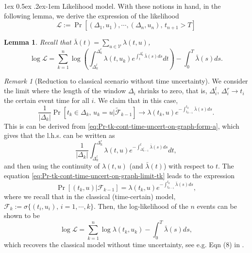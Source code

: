 \documentclass[11pt]{article}
\makeatletter
\newtheorem{lemma}[theorem]{Lemma}
\theoremstyle{remark}
\newtheorem{remark}{Remark}[section]
\theoremstyle{plain}
\newcommand{\calL}{\mathcal{L}}
\newcommand{\calF}{\mathcal{F}}
\newcommand{\calV}{\mathcal{V}}
\renewcommand{\paragraph}{%
  \@startsection{paragraph}{4}%
  {\z@}{1ex \@plus 0.5ex \@minus .2ex}{-1em}%
  {\normalfont\normalsize\itshape}%
}
\makeatother
\begin{document}
\paragraph{Likelihood model.}
With these notions in hand, in the following lemma, we derive the expression of the likelihood 
\[
\calL :=  \Pr [   (\Delta_1, u_1),  \cdots, ( \Delta_n, u_n), \, t_{n+1} > T] 
\]
\begin{lemma}\label{lemma:logL-cont-time-uncert-on-graph}
Recall that $\bar{\lambda}(t) = \sum_{u \in\calV} \lambda(t,u)$, 
\begin{equation}\label{eq:logL-cont-time-uncert-on-graph}
\log \calL = \sum_{k=1}^n \log \left( \int_{\Delta_k^l}^{\Delta_k^r} \lambda( t, u_k) e^{ \int_t^{\Delta_{k}^r}  \bar{\lambda} (s) ds} dt
		\right) - \int_0^T \bar{\lambda}(s) ds.
\end{equation}
\end{lemma}



\begin{remark}[Reduction to classical scenario without time uncertainty]
We consider the limit where the length of the window $\Delta_i$ shrinks to zero, 
that is, $\Delta_i^{l}, \, \Delta_i^{r} \to t_i$  the certain event time for all $i$.
We claim that in this case, 
\begin{equation}\label{eq:Pr-tk-cont-time-uncert-on-graph-limit-tk}
\frac{1}{|\Delta_k|}\Pr [ t_k \in \Delta_k, \, u_k = u | \tilde{\calF}_{k-1}]
\to \lambda( t_k, u)  e^{ - \int_{t_{k-1}}^{t_{k}}  \bar{\lambda} (s) ds}.
\end{equation}
This is can be derived from \eqref{eq:Pr-tk-cont-time-uncert-on-graph-form-a}, which gives that the l.h.s. can be written as 
\[
\frac{1}{|\Delta_k|} \int_{\Delta_k^l}^{\Delta_k^r} \lambda( t, u) e^{ - \int_{\Delta_{k-1}^r}^t \bar{\lambda}(s) ds} dt, 
\]
and then using the continuity of $\lambda(t,u)$ (and $\bar{\lambda}(t)$) with respect to $t$.
The equation \eqref{eq:Pr-tk-cont-time-uncert-on-graph-limit-tk} leads to the expression
\[
\Pr [ (t_k, u) | \calF_{k-1}] = \lambda( t_k, u)  e^{ - \int_{t_{k-1}}^{t_{k}}  \bar{\lambda} (s) ds},
\]
where we recall that in the classical (time-certain) model, 
$\calF_{k}:=\sigma\{ (t_i, u_i), \, i=1,\cdots, k \}$. 
Then, the log-likelihood of the $n$ events can be shown to be
\[
\log \calL = \sum_{k=1}^n \log \lambda( t_k, u_k ) - \int_0^T  \bar{\lambda} (s) ds,
\]
which recovers the classical model without time uncertainty, see e.g. Eqn (8) in \cite{reinhart2018review}. 
\end{remark}
\end{document}
